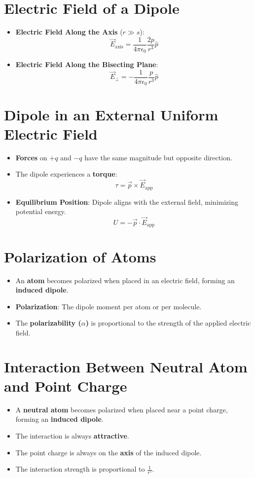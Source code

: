 \documentclass{article}
\begin{document}
\section*{Electric Field of a Dipole}
\begin{itemize}
    \item \textbf{Electric Field Along the Axis} (\(r \gg s\)):
    \[
    \vec{E}_{\text{axis}} = \frac{1}{4\pi\epsilon_0} \frac{2p}{r^3} \hat{p}
    \]
    \item \textbf{Electric Field Along the Bisecting Plane}:
    \[
    \vec{E}_{\perp} = -\frac{1}{4\pi\epsilon_0} \frac{p}{r^3} \hat{p}
    \]
\end{itemize}

\section*{Dipole in an External Uniform Electric Field}
\begin{itemize}
    \item \textbf{Forces} on \(+q\) and \(-q\) have the same magnitude but opposite direction.
    \item The dipole experiences a \textbf{torque}:
    \[
    \tau = \vec{p} \times \vec{E}_{\text{app}}
    \]
    \item \textbf{Equilibrium Position}: Dipole aligns with the external field, minimizing potential energy.
    \[
    U = -\vec{p} \cdot \vec{E}_{\text{app}}
    \]
\end{itemize}

\section*{Polarization of Atoms}
\begin{itemize}
    \item An \textbf{atom} becomes polarized when placed in an electric field, forming an \textbf{induced dipole}.
    \item \textbf{Polarization}: The dipole moment per atom or per molecule.
    \item The \textbf{polarizability (\(\alpha\))} is proportional to the strength of the applied electric field.
\end{itemize}

\section*{Interaction Between Neutral Atom and Point Charge}
\begin{itemize}
    \item A \textbf{neutral atom} becomes polarized when placed near a point charge, forming an \textbf{induced dipole}.
    \item The interaction is always \textbf{attractive}.
    \item The point charge is always on the \textbf{axis} of the induced dipole.
    \item The interaction strength is proportional to \(\frac{1}{r^5}\).
\end{itemize}
\end{document}
